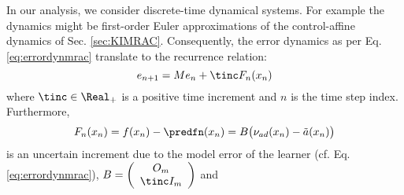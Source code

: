 In our analysis, we consider discrete-time dynamical systems. For example the dynamics might be first-order Euler approximations of the control-affine dynamics of Sec. \ref{sec:KIMRAC}.
Consequently, the error dynamics as per Eq. \ref{eq:errordynmrac} translate to the recurrence relation:
\begin{equation}\label{eq:errordynmrac_nIMRACdiscrete}
	e_{n+1}  = M e_n + \tinc F_n(x_n)
\end{equation}
where $\tinc \in \Real_+$ is a positive time increment and  $n$ is the time step index. Furthermore,
%
\begin{equation}
	F_n(x_n) = f(x_n) - \predfn(x_n) = B \bigl(\nu_{ad}(x_n) -  \tilde a(x_n)\bigr) 
\end{equation}
is an uncertain increment due to the model error of the learner (cf. Eq. \ref{eq:errordynmrac}), 						$B = \left(\begin{array}[h]{c}
				O_m \\ \tinc I_m
						\end{array}\right)$ and 

